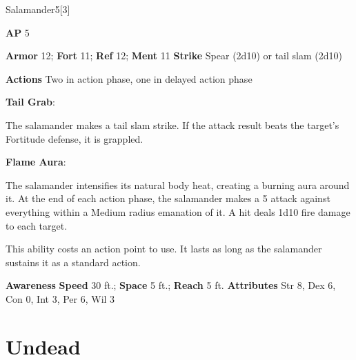 \begin{monsection}[Battlemaster]{Salamander}{5}[3]
\vspace{-1em}\vspace{-1em}
\begin{spellcontent}
\begin{spelltargetinginfo}
{\textbf{AP} 5}

\pari \textbf{Armor} 12;
\textbf{Fort} 11;
\textbf{Ref} 12;
\textbf{Ment} 11
\pari \textbf{Strike} Spear  (2d10) or tail slam  (2d10)


\pari \textbf{Actions} Two in action phase, one in delayed action phase
\end{spelltargetinginfo}


\begin{spelleffects}

\pari
\textbf{Tail Grab}:

The salamander makes a tail slam strike.
If the attack result beats the target's Fortitude defense, it is grappled.




\vspace{0.5em}
\pari
\textbf{Flame Aura}:

The salamander intensifies its natural body heat, creating a burning aura around it.
At the end of each action phase, the salamander makes a 5 attack
against everything within a Medium radius emanation of it.
A hit deals 1d10 fire damage to each target.

This ability costs an action point to use.
It lasts as long as the salamander sustains it as a standard action.




\end{spelleffects}

\end{spellcontent}

\begin{monsterfooter}
\pari \textbf{Awareness} 
\pari \textbf{Speed} 30 ft.;
\textbf{Space} 5 ft.;
\textbf{Reach} 5 ft.
\pari \textbf{Attributes}
Str 8,
Dex 6,
Con 0,
Int 3,
Per 6,
Wil 3
\end{monsterfooter}
\end{monsection}


\section{Undead}

